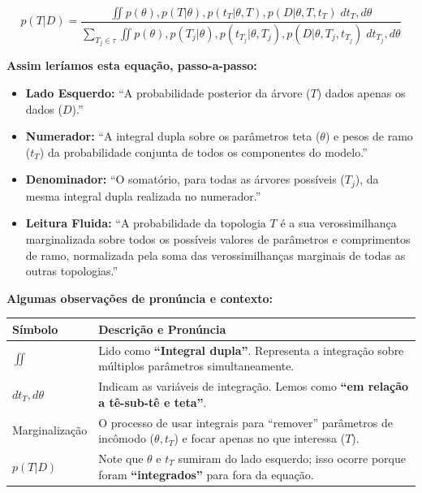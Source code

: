 $$p(T|D) = \frac{\iint p(\theta), p(T|\theta), p(t_T|\theta, T), p(D|\theta, T, t_T)\; dt_T, d\theta}{\sum_{T_j \in \tau} \iint p(\theta), p(T_j|\theta), p(t_{T_j}|\theta, T_j), p(D|\theta, T_j, t_{T_j})\; dt_{T_j}, d\theta}$$

\textbf{Assim leríamos esta equação, passo-a-passo:}

\begin{itemize}
    \item \textbf{Lado Esquerdo:} ``A probabilidade posterior da árvore ($T$) dados apenas os dados ($D$).''
    \item \textbf{Numerador:} ``A integral dupla sobre os parâmetros teta ($\theta$) e pesos de ramo ($t_T$) da probabilidade conjunta de todos os componentes do modelo.''
    \item \textbf{Denominador:} ``O somatório, para todas as árvores possíveis ($T_j$), da mesma integral dupla realizada no numerador.''
    \item \textbf{Leitura Fluida:} ``A probabilidade da topologia $T$ é a sua verossimilhança marginalizada sobre todos os possíveis valores de parâmetros e comprimentos de ramo, normalizada pela soma das verossimilhanças marginais de todas as outras topologias.''
\end{itemize}

\vspace{0.5cm}

\textbf{Algumas observações de pronúncia e contexto:}

\begin{center}
\renewcommand{\arraystretch}{1.5}
\begin{tabular}{lp{10cm}}
\hline
\textbf{Símbolo} & \textbf{Descrição e Pronúncia} \\ \hline
$\iint$ & Lido como \textbf{``Integral dupla''}. Representa a integração sobre múltiplos parâmetros simultaneamente. \\
$dt_T, d\theta$ & Indicam as variáveis de integração. Lemos como \textbf{``em relação a tê-sub-tê e teta''}. \\
Marginalização & O processo de usar integrais para ``remover'' parâmetros de incômodo ($\theta, t_T$) e focar apenas no que interessa ($T$). \\
$p(T|D)$ & Note que $\theta$ e $t_T$ sumiram do lado esquerdo; isso ocorre porque foram \textbf{``integrados''} para fora da equação. \\ \hline
\end{tabular}
\end{center}

